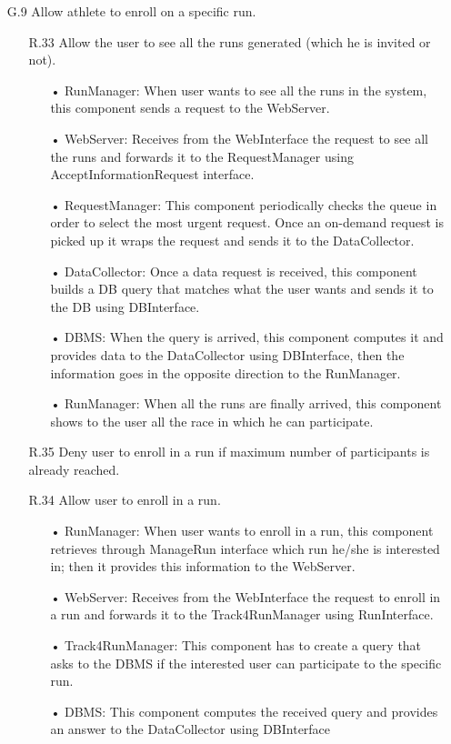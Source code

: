 \begin{enumerate}
\item [G.9] Allow athlete to enroll on a specific run.
	\begin{enumerate}
	\item [R.33] Allow the user to see all the runs generated (which he is invited or not).
		\begin{enumerate}
		\item[•] RunManager: When user wants to see all the runs in the system, this component sends a request to the WebServer.
		\item[•] WebServer: Receives from the WebInterface the request to see all the runs and forwards it to the RequestManager using AcceptInformationRequest interface.
		\item[•] RequestManager: This component periodically checks the queue in order to select the most urgent request. Once an on-demand request is picked up it wraps the request and sends it to the DataCollector.
		\item[•] DataCollector: Once a data request is received, this component builds a DB query that matches what the user wants and sends it to the DB using DBInterface.
		\item[•] DBMS: When the query is arrived, this component computes it and provides data to the DataCollector using DBInterface, then the information goes in the opposite direction to the RunManager.
		\item[•] RunManager: When all the runs are finally arrived, this component shows to the user all the race in which he can participate.
		\end{enumerate}	
	\item [R.35] Deny user to enroll in a run if maximum number of participants is already reached.
	\item [R.34] Allow user to enroll in a run.
		\begin{enumerate}
		\item[•] RunManager: When user wants to enroll in a run, this component retrieves through ManageRun interface which run he/she is interested in; then it provides this information to the WebServer.
		\item[•] WebServer: Receives from the WebInterface the request to enroll in a run and forwards it to the Track4RunManager using RunInterface.
		\item[•] Track4RunManager: This component has to create a query that asks to the DBMS if the interested user can participate to the specific run.
		\item[•] DBMS: This component computes the received query and provides an answer to the DataCollector using DBInterface

\end{enumerate}
\end{enumerate}
\end{enumerate}
